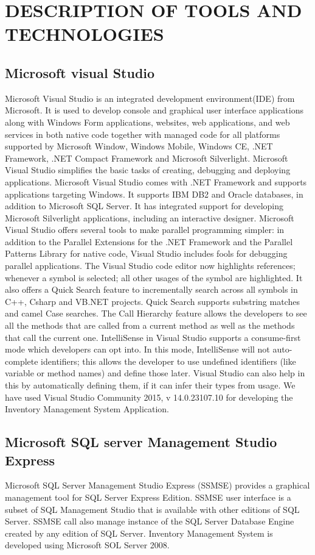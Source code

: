 \chapter{DESCRIPTION OF TOOLS AND TECHNOLOGIES}
\section{Microsoft visual Studio}
Microsoft Visual Studio is an integrated development environment(IDE) from Microsoft. It is used to develop console and graphical user interface applications along with Windows Form applications, websites, web applications, and web services in both native code together with managed code for all platforms supported by Microsoft Window, Windows Mobile, Windows CE, .NET Framework, .NET Compact Framework and Microsoft Silverlight. Microsoft Visual Studio simplifies the basic tasks of creating, debugging and deploying applications.
Microsoft Visual Studio comes with .NET Framework and supports applications targeting Windows. It supports IBM DB2 and Oracle databases, in addition to Microsoft SQL Server. It has integrated support for developing Microsoft Silverlight applications, including an interactive designer. Microsoft Visual Studio offers several tools to make parallel programming simpler: in addition to the Parallel Extensions for the .NET Framework and the Parallel Patterns Library for native code, Visual Studio includes fools for debugging parallel applications.
The Visual Studio code editor now highlights references; whenever a symbol is selected; all other usages of the symbol are highlighted. It also offers a Quick Search feature to incrementally search across all symbols in C++, Csharp and VB.NET projects. Quick Search supports substring matches and camel Case searches. The Call Hierarchy feature allows the developers to see all the methods that are called from a current method as well as the methods that call the current one. IntelliSense in Visual Studio supports a consume-first mode which developers can opt into. In this mode, IntelliSense will not auto-complete identifiers; this allows the developer to use undefined identifiers (like variable or method names) and define those later. Visual Studio can also help in this by automatically defining them, if it can infer their types from usage.
We have used Visual Studio Community 2015, v 14.0.23107.10 for developing the Inventory Management System Application.

\section{Microsoft SQL server Management Studio Express}
Microsoft SQL Server Management Studio Express (SSMSE) provides a graphical management tool for SQL Server Express Edition. SSMSE user interface is a subset of SQL Management Studio that is available with other editions of SQL Server. SSMSE call also manage instance of the SQL Server Database Engine created by any edition of SQL Server. Inventory Management System is developed using Microsoft SOL Server 2008.
